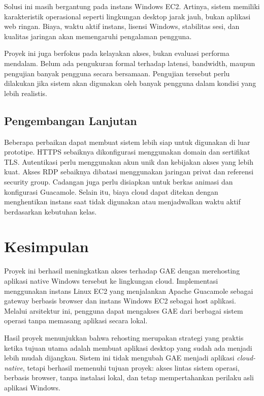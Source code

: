 \documentclass[conference]{IEEEtran}
\begin{document}
Solusi ini masih bergantung pada instans Windows EC2. Artinya, sistem memiliki karakteristik operasional seperti lingkungan desktop jarak jauh, bukan aplikasi web ringan. Biaya, waktu aktif instans, lisensi Windows, stabilitas sesi, dan kualitas jaringan akan memengaruhi pengalaman pengguna.

Proyek ini juga berfokus pada kelayakan akses, bukan evaluasi performa mendalam. Belum ada pengukuran formal terhadap latensi, bandwidth, maupun pengujian banyak pengguna secara bersamaan. Pengujian tersebut perlu dilakukan jika sistem akan digunakan oleh banyak pengguna dalam kondisi yang lebih realistis.

\subsection{Pengembangan Lanjutan}

Beberapa perbaikan dapat membuat sistem lebih siap untuk digunakan di luar prototipe. HTTPS sebaiknya dikonfigurasi menggunakan domain dan sertifikat TLS. Autentikasi perlu menggunakan akun unik dan kebijakan akses yang lebih kuat. Akses RDP sebaiknya dibatasi menggunakan jaringan privat dan referensi security group. Cadangan juga perlu disiapkan untuk berkas animasi dan konfigurasi Guacamole. Selain itu, biaya cloud dapat ditekan dengan menghentikan instans saat tidak digunakan atau menjadwalkan waktu aktif berdasarkan kebutuhan kelas.

\section{Kesimpulan}

Proyek ini berhasil meningkatkan akses terhadap GAE dengan merehosting aplikasi native Windows tersebut ke lingkungan cloud. Implementasi menggunakan instans Linux EC2 yang menjalankan Apache Guacamole sebagai gateway berbasis browser dan instans Windows EC2 sebagai host aplikasi. Melalui arsitektur ini, pengguna dapat mengakses GAE dari berbagai sistem operasi tanpa memasang aplikasi secara lokal.

Hasil proyek menunjukkan bahwa rehosting merupakan strategi yang praktis ketika tujuan utama adalah membuat aplikasi desktop yang sudah ada menjadi lebih mudah dijangkau. Sistem ini tidak mengubah GAE menjadi aplikasi \textit{cloud-native}, tetapi berhasil memenuhi tujuan proyek: akses lintas sistem operasi, berbasis browser, tanpa instalasi lokal, dan tetap mempertahankan perilaku asli aplikasi Windows.
\end{document}
